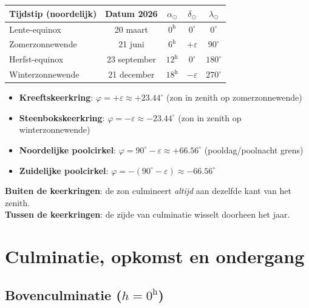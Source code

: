 \documentclass[11pt, a4paper]{article}
\newcommand{\graden}{^{\circ}}
\newcommand{\zon}{\odot}
\begin{document}
\begin{center}
\renewcommand{\arraystretch}{1.4}
\begin{tabular}{lcccc}
\toprule
\textbf{Tijdstip (noordelijk)} & \textbf{Datum 2026} & $\alpha_\zon$ & $\delta_\zon$ & $\lambda_\zon$ \\
\midrule
Lente-equinox    & 20 maart      & $0^\mathrm{h}$  & $0\graden$    & $0\graden$ \\
Zomerzonnewende  & 21 juni       & $6^\mathrm{h}$  & $+\varepsilon$ & $90\graden$ \\
Herfst-equinox   & 23 september  & $12^\mathrm{h}$ & $0\graden$    & $180\graden$ \\
Winterzonnewende & 21 december   & $18^\mathrm{h}$ & $-\varepsilon$ & $270\graden$ \\
\bottomrule
\end{tabular}
\end{center}

\begin{weetje}
\begin{itemize}[leftmargin=1.5em, itemsep=2pt]
  \item \textbf{Kreeftskeerkring}: $\varphi = +\varepsilon \approx +23.44\graden$
    (zon in zenith op zomerzonnewende)
  \item \textbf{Steenbokskeerkring}: $\varphi = -\varepsilon \approx -23.44\graden$
    (zon in zenith op winterzonnewende)
  \item \textbf{Noordelijke poolcirkel}: $\varphi = 90\graden - \varepsilon \approx +66.56\graden$
    (pooldag/poolnacht grens)
  \item \textbf{Zuidelijke poolcirkel}: $\varphi = -(90\graden - \varepsilon) \approx -66.56\graden$
\end{itemize}
\textbf{Buiten de keerkringen}: de zon culmineert \emph{altijd} aan dezelfde kant van het zenith.\\
\textbf{Tussen de keerkringen}: de zijde van culminatie wisselt doorheen het jaar.
\end{weetje}

\section{Culminatie, opkomst en ondergang}

\subsection{Bovenculminatie ($h = 0^\mathrm{h}$)}
\end{document}
